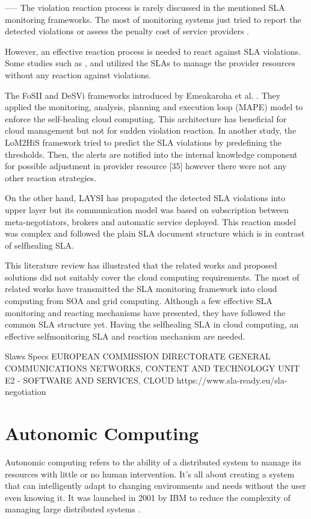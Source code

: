 -----
The violation reaction process is rarely discussed in the mentioned SLA monitoring frameworks.  The most of monitoring systems just tried to report the detected violations \cite{6225938} \cite{5175897} or assess the penalty cost of service providers \cite{10.1007/978-3-642-22709-7_46} \cite{Dastjerdi:2012:DOA:2275356.2275360}.

However, an effective reaction process is needed to react against SLA violations. Some studies such as \cite{6212007}, \cite{6150077} and \cite{WANG20121135} utilized the SLAs to manage the provider resources without any reaction against violations. 

The FoSII and DeSVi frameworks introduced by Emeakaroha et al. \cite{ [fosii] }\cite{EMEAKAROHA20121017}. They applied the monitoring, analysis, planning and execution loop
(MAPE) model to enforce the self-healing cloud computing. This architecture has beneficial for cloud management but not for sudden violation reaction. In another study, the LoM2HiS \cite{ [emeakaroha2010low] } framework tried to predict the SLA violations by predefining the thresholds. Then, the alerts are notified into the internal knowledge component for possible adjustment in provider resource [35] however there were not any other reaction strategies. 

On the other hand, LAYSI \cite{5614035} has propagated the detected SLA violations into upper layer but its communication model was based on subscription between meta-negotiators, brokers
and automatic service deployed. This reaction model was complex and followed the plain SLA document structure which is in contrast of selfhealing SLA. 

This literature review has illustrated that the related works and proposed solutions did  not suitably cover the cloud computing requirements. The most of related works have transmitted the SLA monitoring framework into cloud computing from SOA and grid computing. Although a few effective SLA monitoring and reacting mechanisms have presented, they have followed the common SLA structure yet. Having the selfhealing SLA in cloud computing, an effective selfmonitoring SLA and reaction mechanism are needed.



Slaws
Specs
EUROPEAN COMMISSION DIRECTORATE GENERAL COMMUNICATIONS NETWORKS, CONTENT AND TECHNOLOGY UNIT E2 - SOFTWARE AND SERVICES, CLOUD
https://www.sla-ready.eu/sla-negotiation

\section{Autonomic Computing}
Autonomic computing refers to the ability of a distributed system to manage its resources with little or no human intervention. It's all about creating a system that can intelligently adapt to changing environments and needs without the user even knowing it. It was launched in 2001 by IBM to reduce the complexity of managing large distributed systems \cite{horn2001autonomic}.


